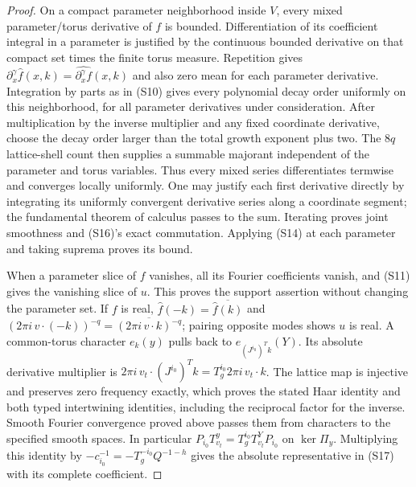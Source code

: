 \begin{proof}
On a compact parameter neighborhood inside $V$, every mixed
parameter/torus derivative of $f$ is bounded. Differentiation of
its coefficient integral in a parameter is justified by the
continuous bounded derivative on that compact set times the
finite torus measure. Repetition gives
$\partial_x^\gamma\widehat f(x,k)
=\widehat{\partial_x^\gamma f}(x,k)$ and also zero mean for
each parameter derivative. Integration by parts as in (S10)
gives every polynomial decay order uniformly on this neighborhood,
for all parameter derivatives under consideration. After multiplication
by the inverse multiplier and any fixed coordinate derivative,
choose the decay order larger than the total growth exponent plus
two. The $8q$ lattice-shell count then supplies a summable majorant
independent of the parameter and torus variables. Thus every mixed
series differentiates termwise and converges locally uniformly.
One may justify each first derivative directly by integrating its
uniformly convergent derivative series along a coordinate segment;
the fundamental theorem of calculus passes to the sum. Iterating
proves joint smoothness and (S16)'s exact commutation. Applying
(S14) at each parameter and taking suprema proves its bound.

When a parameter slice of $f$ vanishes, all its Fourier coefficients
vanish, and (S11) gives the vanishing slice of $u$. This proves the
support assertion without changing the parameter set. If $f$ is
real, $\widehat f(-k)=\overline{\widehat f(k)}$ and
$(2\pi i\,v\cdot(-k))^{-q}
=\overline{(2\pi i\,v\cdot k)^{-q}}$; pairing opposite modes
shows $u$ is real. A common-torus character $e_k(y)$ pulls back
to $e_{(J^{i_0})^Tk}(Y)$. Its absolute derivative multiplier is
$2\pi i\,v_t\cdot(J^{i_0})^Tk
=T_g^{i_0}2\pi i\,v_t\cdot k$.
The lattice map is injective and preserves zero frequency exactly,
which proves the stated Haar identity and both typed intertwining
identities, including the reciprocal factor for the inverse. Smooth
Fourier convergence proved above passes them from characters to the
specified smooth spaces. In particular
$P_{i_0}T_{v_t}^y=T_g^{i_0}T_{v_t}^YP_{i_0}$ on $\ker\Pi_y$.
Multiplying this identity by
$-c_{i_0}^{-1}=-T_g^{-i_0}Q^{-1-h}$ gives the absolute
representative in (S17) with its complete coefficient.


\end{proof}
